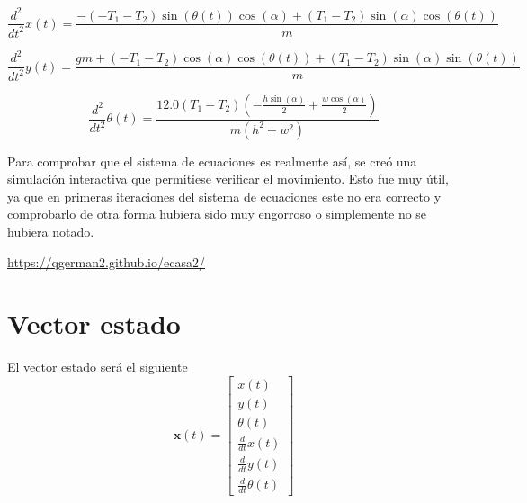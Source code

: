 \documentclass[titlepage, letterpaper]{article}
\begin{document}
\begin{equation*}\frac{d^{2}}{d t^{2}} x{\left(t \right)} = \frac{- \left(- T_{1} - T_{2}\right) \sin{\left(\theta{\left(t \right)} \right)} \cos{\left(\alpha \right)} + \left(T_{1} - T_{2}\right) \sin{\left(\alpha \right)} \cos{\left(\theta{\left(t \right)} \right)}}{m}\end{equation*}

\begin{equation*}\frac{d^{2}}{d t^{2}} y{\left(t \right)} = \frac{g m + \left(- T_{1} - T_{2}\right) \cos{\left(\alpha \right)} \cos{\left(\theta{\left(t \right)} \right)} + \left(T_{1} - T_{2}\right) \sin{\left(\alpha \right)} \sin{\left(\theta{\left(t \right)} \right)}}{m}\end{equation*}

\begin{equation*}\frac{d^{2}}{d t^{2}} \theta{\left(t \right)} = \frac{12.0 \left(T_{1} - T_{2}\right) \left(- \frac{h \sin{\left(\alpha \right)}}{2} + \frac{w \cos{\left(\alpha \right)}}{2}\right)}{m \left(h^{2} + w^{2}\right)}\end{equation*}

Para comprobar que el sistema de ecuaciones es realmente así, se creó una simulación interactiva que permitiese verificar el movimiento. Esto fue muy útil, ya que en primeras iteraciones del sistema de ecuaciones este no era correcto y comprobarlo de otra forma hubiera sido muy engorroso o simplemente no se hubiera notado.

\url{https://qgerman2.github.io/ecasa2/}

\section{Vector estado}

El vector estado será el siguiente
\begin{equation*}\pmb{x}{\left(t \right)} = \left[\begin{matrix}x{\left(t \right)}\\y{\left(t \right)}\\\theta{\left(t \right)}\\\frac{d}{d t} x{\left(t \right)}\\\frac{d}{d t} y{\left(t \right)}\\\frac{d}{d t} \theta{\left(t \right)}\end{matrix}\right]\end{equation*}
\end{document}
